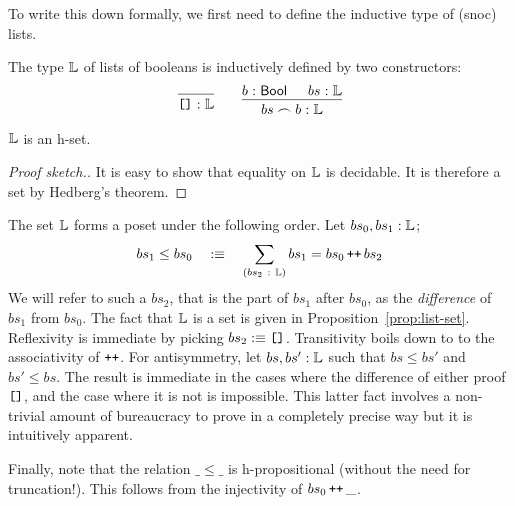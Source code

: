 To write this down formally, we first need to define the inductive type of (snoc) lists.

\begin{defn}[Lists]\label{defn:list}
  The type $\mathbb{L}{}$ of lists of booleans is inductively defined by two constructors:
  \[
    \begin{prooftree}
      \infer0{\oftyI{\emptylist{}}{\listty{}}}
    \end{prooftree}
    \qquad
    \begin{prooftree}
      \hypo{\oftyI{b}{\bool{}}}
      \hypo{\oftyI{bs}{\listty{}}}
      \infer2{\oftyI{bs \frown b}{\listty{}}}
    \end{prooftree}
  \]
\end{defn}

\begin{prop}\label{prop:list-set}
  $\mathbb{L}$ is an h-set.
\end{prop}
\begin{proof}[Proof sketch.]
  It is easy to show that equality on $\mathbb{L}{}$ is decidable. It is therefore a set
  by Hedberg's theorem.
\end{proof}


\begin{defn}\label{defn:cantor-poset}
  The set $\mathbb{L}{}$ forms a poset under the following order. Let
  $bs_0, bs_1:\mathbb{L}{}$;
  \begin{equation*}
    bs_1 \le bs_0 \quad:\equiv\quad \sum_{(bs_2~:~\mathbb{L}{})} bs_1 = bs_0 \operatorname{\text{\texttt{++}}} bs_2
  \end{equation*}
  We will refer to such a $bs_2$, that is the part of $bs_1$ after $bs_0$, as the
  \emph{difference} of $bs_1$ from $bs_0$. The fact that $\mathbb{L}$ is a set is given in
  Proposition~\ref{prop:list-set}. Reflexivity is immediate by picking $bs_2 :\equiv
  \text{\texttt{[]}}{}$. Transitivity boils down to to the associativity of $\operatorname{\text{\texttt{++}}}$. For
  antisymmetry, let $bs, bs':\mathbb{L}{}$ such that $bs \le bs'$ and $bs' \le bs$. The
  result is immediate in the cases where the difference of either proof $\text{\texttt{[]}}$, and
  the case where it is not is impossible. This latter fact involves a non-trivial amount
  of bureaucracy to prove in a completely precise way but it is intuitively apparent.

  Finally, note that the relation $\_\le\_$ is h-propositional (without the need for
  truncation!). This follows from the injectivity of $bs_0 \operatorname{\text{\texttt{++}}} \_$.
\end{defn}

